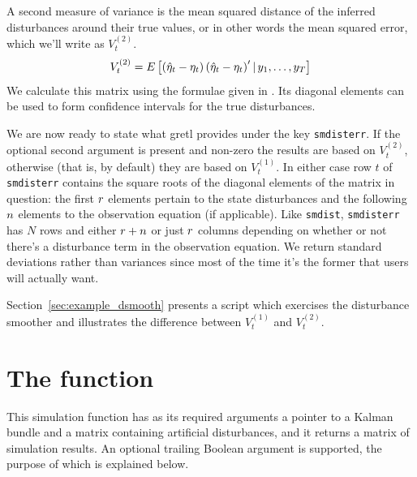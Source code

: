 A second measure of variance is the mean squared distance of the
inferred disturbances around their true values, or in other words the
mean squared error, which we'll write as $V^{(2)}_t$.
\[
V^{(2)}_t = E\left[\left(\hat{\eta}_t - \eta_t\right)
  \left(\hat{\eta}_t - \eta_t\right)'
  | \,y_1, \ldots, y_T \right]
\]
We calculate this matrix using the formulae given in \citet[section
4.5.2]{durbin-koopman12}. Its diagonal elements can be used to form
confidence intervals for the true disturbances.

We are now ready to state what gretl provides under the key
\texttt{smdisterr}. If the optional second argument is present and
non-zero the results are based on $V^{(2)}_t$, otherwise (that is, by
default) they are based on $V^{(1)}_t$. In either case row $t$ of
\texttt{smdisterr} contains the square roots of the diagonal elements
of the matrix in question: the first $r$ elements pertain to the
state disturbances and the following $n$ elements to the
observation equation (if applicable). Like \texttt{smdist},
\texttt{smdisterr} has $N$ rows and either $r + n$ or just
$r$ columns depending on whether or not there's a disturbance
term in the observation equation. We return standard deviations rather
than variances since most of the time it's the former that users will
actually want.

Section~\ref{sec:example_dsmooth} presents a script which exercises
the disturbance smoother and illustrates the difference between
$V^{(1)}_t$ and $V^{(2)}_t$.

\section{The  function}
\label{sec:ksimul}

This simulation function has as its required arguments a pointer to a
Kalman bundle and a matrix containing artificial disturbances, and it
returns a matrix of simulation results. An optional trailing Boolean
argument is supported, the purpose of which is explained below.

